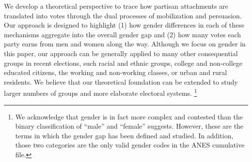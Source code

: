 \documentclass[12pt
               ,final
               ]{article}
\begin{document}
We develop a theoretical perspective to trace how partisan attachments are translated into votes through the dual processes of mobilization and persuasion. Our approach is designed to highlight (1) how gender differences in each of these mechanisms aggregate into the overall gender gap and (2) how many votes each party earns from men and women along the way. Although we focus on gender in this paper, our approach can be generally applied to many other consequential groups in recent elections, such racial and ethnic groups, college and non-college educated citizens, the working and non-working classes, or urban and rural residents. We believe that our theoretical foundation can be extended to study larger numbers of groups and more elaborate electoral systems.%
 \footnote{We acknowledge that gender is in fact more complex and contested than the binary classification of ``male'' and ``female'' suggests. However, these are the terms in which the gender gap has been defined and studied. In addition, those two categories are the only valid gender codes in the ANES cumulative file.}

\end{document}
